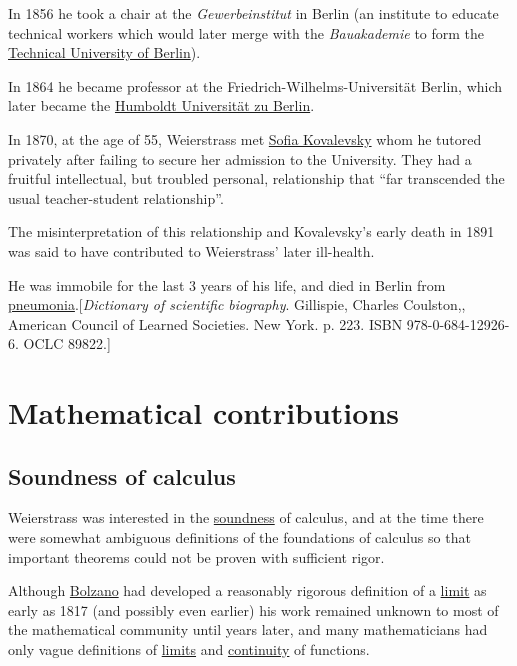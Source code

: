 \documentclass{book}
\numberwithin{equation}{section}
\begin{document}
In 1856 he took a chair at the \textit{Gewerbeinstitut} in Berlin (an institute to educate technical workers which would later merge with the \textit{Bauakademie} to form the \href{https://en.wikipedia.org/wiki/Technical_University_of_Berlin}{Technical University of Berlin}).

In 1864 he became professor at the Friedrich-Wilhelms-Universität Berlin, which later became the \href{https://en.wikipedia.org/wiki/Humboldt_University_of_Berlin}{Humboldt Universität zu Berlin}.

%
In 1870, at the age of 55, Weierstrass met \href{https://en.wikipedia.org/wiki/Sofia_Kovalevskaya}{Sofia Kovalevsky} whom he tutored privately after failing to secure her admission to the University.
They had a fruitful intellectual, but troubled personal, relationship that ``far transcended the usual teacher-student relationship''.

The misinterpretation of this relationship and Kovalevsky's early death in 1891 was said to have contributed to Weierstrass' later ill-health.

He was immobile for the last 3 years of his life, and died in Berlin from \href{https://en.wikipedia.org/wiki/Pneumonia}{pneumonia}.[\textit{Dictionary of scientific biography}. Gillispie, Charles Coulston,, American Council of Learned Societies. New York. p. 223. ISBN 978-0-684-12926-6. OCLC 89822.]

\section{Mathematical contributions}

\subsection{Soundness of calculus}
Weierstrass was interested in the \href{https://en.wikipedia.org/wiki/Soundness}{soundness} of calculus, and at the time there were somewhat ambiguous definitions of the foundations of calculus so that important theorems could not be proven with sufficient rigor.

Although \href{https://en.wikipedia.org/wiki/Bernard_Bolzano}{Bolzano} had developed a reasonably rigorous definition of a \href{https://en.wikipedia.org/wiki/Limit_of_a_function}{limit} as early as 1817 (and possibly even earlier) his work remained unknown to most of the mathematical community until years later, and many mathematicians had only vague definitions of \href{https://en.wikipedia.org/wiki/Limit_of_a_function}{limits} and \href{https://en.wikipedia.org/wiki/Continuous_function}{continuity} of functions.
\end{document}
